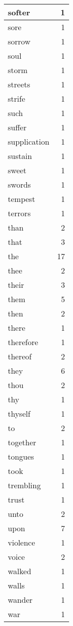 \begin{center}
\begin{longtable}{l|r}
softer & 1 \\ \hline
sore & 1 \\ \hline
sorrow & 1 \\ \hline
soul & 1 \\ \hline
storm & 1 \\ \hline
streets & 1 \\ \hline
strife & 1 \\ \hline
such & 1 \\ \hline
suffer & 1 \\ \hline
supplication & 1 \\ \hline
sustain & 1 \\ \hline
sweet & 1 \\ \hline
swords & 1 \\ \hline
tempest & 1 \\ \hline
terrors & 1 \\ \hline
than & 2 \\ \hline
that & 3 \\ \hline
the & 17 \\ \hline
thee & 2 \\ \hline
their & 3 \\ \hline
them & 5 \\ \hline
then & 2 \\ \hline
there & 1 \\ \hline
therefore & 1 \\ \hline
thereof & 2 \\ \hline
they & 6 \\ \hline
thou & 2 \\ \hline
thy & 1 \\ \hline
thyself & 1 \\ \hline
to & 2 \\ \hline
together & 1 \\ \hline
tongues & 1 \\ \hline
took & 1 \\ \hline
trembling & 1 \\ \hline
trust & 1 \\ \hline
unto & 2 \\ \hline
upon & 7 \\ \hline
violence & 1 \\ \hline
voice & 2 \\ \hline
walked & 1 \\ \hline
walls & 1 \\ \hline
wander & 1 \\ \hline
war & 1 \\ \hline

\end{longtable}
\end{center}
